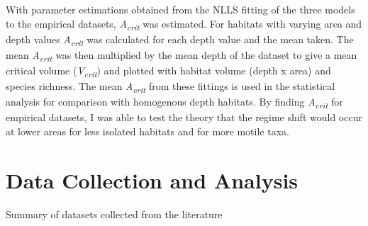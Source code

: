 \noindent With parameter estimations obtained from the NLLS fitting of the three models to the empirical datasets, \textit{A\textsubscript{crit}} was estimated. For habitats with varying area and depth values \textit{A\textsubscript{crit}} was calculated for each depth value and the mean taken. The mean \textit{A\textsubscript{crit}} was then multiplied by the mean depth of the dataset to give a mean critical volume (\textit{V\textsubscript{crit}}) and plotted with habitat volume (depth x area) and species richness. The mean \textit{A\textsubscript{crit}} from these fittings is used in the statistical analysis for comparison with homogenous depth habitats. By finding \textit{A\textsubscript{crit}} for empirical datasets, I was able to test the theory that the regime shift would occur at lower areas for less isolated habitats and for more motile taxa.


\section{Data Collection and Analysis}

\begin{table}[h!]
  \begin{center}
    \caption{Summary of datasets collected from the literature}
    \label{table2}
  \end{center}
\end{table}


